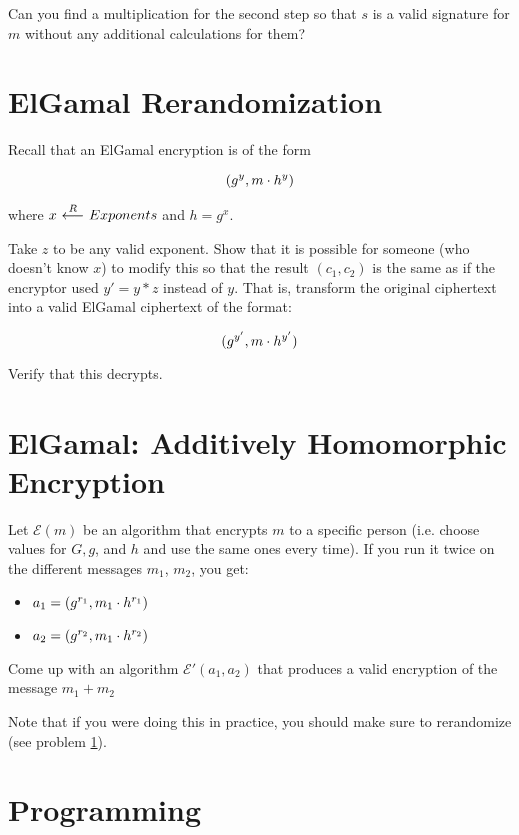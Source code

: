 \documentclass[12pt]{article}
\begin{document}
Can you find a multiplication for the second step so that $s$ is a valid signature for $m$ without any additional calculations for them?


\section{ElGamal Rerandomization}

\label{rerandomize}

Recall that an ElGamal encryption is of the form

$$
(g^y, m \cdot h^y)
$$

where $x {\ \overset{R}\longleftarrow\ } Exponents$ and $h = g^x$.

Take $z$ to be any valid exponent. Show that it is possible for someone (who doesn't know $x$) to modify this so that the result $(c_1, c_2)$ is the same as if the encryptor used $y' = y * z$ instead of $y$. That is, transform the original ciphertext into a valid ElGamal ciphertext of the format:

$$
(g^{y'}, m \cdot h^{y'})
$$

Verify that this decrypts.

\section{ElGamal: Additively Homomorphic Encryption}

Let $\mathcal{E}(m)$ be an algorithm that encrypts $m$ to a specific person (i.e. choose values for $G, g$, and $h$ and use the same ones every time). If you run it twice on the different messages $m_1$, $m_2$, you get:

\begin{itemize}
\item $a_1 = (g^{r_1}, m_1 \cdot h^{r_1})$
\item $a_2 = (g^{r_2}, m_1 \cdot h^{r_2})$
\end{itemize}

Come up with an algorithm $\mathcal{E'}(a_1, a_2)$ that produces a valid encryption of the message $m_1 + m_2$


Note that if you were doing this in practice, you should make sure to rerandomize (see problem \ref{rerandomize}).




\section{Programming}
\end{document}
